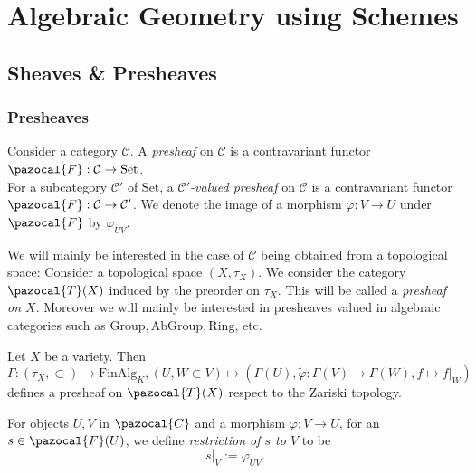 \section{Algebraic Geometry using Schemes}

\subsection{Sheaves \& Presheaves}

\subsubsection{Presheaves}

\begin{definition}
    Consider a category $\mathcal{C}$. A \emph{presheaf} on $\mathcal{C}$ is a contravariant functor $\pazocal{F}: \mathcal{C}\rightarrow \mathrm{Set}$.\\
    For a subcategory $\mathcal{C}'$ of $\mathrm{Set}$, a \emph{$\mathcal{C}'$-valued presheaf} on $\mathcal{C}$ is a contravariant functor $\pazocal{F} : \mathcal{C}\rightarrow \mathcal{C}'$. We denote the image of a morphism $\varphi: V \rightarrow U$ under $\pazocal{F}$ by $\varphi_{UV}$.
\end{definition}
\begin{remark}
    We will mainly be interested in the case of $\mathcal{C}$ being obtained from a topological space: Consider a topological space $(X,\tau_X)$. We consider the category $\pazocal{T}(X)$ induced by the preorder on $\tau_X$. This will be called a \emph{presheaf on $X$}. Moreover we will mainly be interested in presheaves valued in algebraic categories such as $\mathrm{Group},\mathrm{AbGroup},\mathrm{Ring}$, etc.\\  
\end{remark}
\begin{example}
    Let $X$ be a variety. Then $$\Gamma: (\tau_X,\subset) \rightarrow \mathrm{FinAlg}_K, (U, W\subset V)\mapsto (\Gamma(U), \widetilde{\varphi}: \Gamma(V)\rightarrow \Gamma(W), f \mapsto \left.f\right|_{W})$$
    defines a presheaf on $\pazocal{T}(X)$ respect to the Zariski topology. 
\end{example}
\begin{definition}\label{RestrictionInImageOfPresheaf}
    For objects $U,V$ in $\pazocal{C}$ and a morphism $\varphi: V\rightarrow U$, for an  $s\in \pazocal{F}(U)$, we define \emph{restriction of $s$ to $V$} to be $$\left. s\right|_{V}:= \varphi_{UV}.$$
\end{definition}

